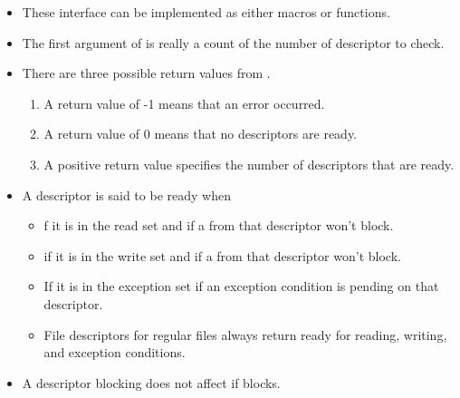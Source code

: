 \documentclass[]{article}
\begin{document}
\begin{itemize}
\item These interface can be implemented as either macros or functions.
\item The first argument of  is really a count of the number of
descriptor to check.
\item There are three possible return values from .
\begin{enumerate}
\item A return value of -1 means that an error occurred.
\item A return value of 0 means that no descriptors are ready.
\item A positive return value specifies the number of descriptors that are
ready.
\end{enumerate}
\item A descriptor is said to be ready when
\begin{itemize}
\item f it is in the read set and if a  from that descriptor won't
block.
\item if it is in the write set and if a  from that descriptor won't
block.
\item If it is in the exception set if an exception condition is pending on that
descriptor.
\item File descriptors for regular files always return ready for reading,
writing, and exception conditions.
\end{itemize}
\item A descriptor blocking does not affect if  blocks.
\end{itemize}
\end{document}
